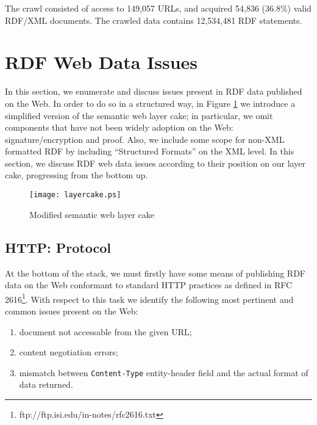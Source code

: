 \documentclass{llncs}
\begin{document}
The crawl consisted of access to 149,057 URLs, and acquired 54,836 (36.8\%) valid RDF/XML documents. The crawled data contains 12,534,481 RDF statements.

\section{RDF Web Data Issues}\label{sec:issues}

In this section, we enumerate and discuss issues present in RDF data published on the Web. 
In order to do so in a structured way, in Figure \ref{fig:layercake} we introduce a simplified version of the semantic web layer cake; in particular, we omit components that have not been widely adoption on the Web: signature/encryption and proof. 
Also, we include some scope for non-XML formatted RDF by including ``Structured Formats'' on the XML level.
In this section, we discuss RDF web data issues according to their position on our layer cake, progressing from the bottom up.

\begin{figure}[!ht]
\begin{center}
\texttt{[image: layercake.ps]}
\end{center}
\caption{\label{fig:layercake} Modified semantic web layer cake}
\end{figure}

\subsection{HTTP: Protocol}
At the bottom of the stack, we must firstly have some means of publishing RDF data on the Web conformant to standard HTTP practices as defined in RFC 2616\footnote{ftp://ftp.isi.edu/in-notes/rfc2616.txt}.
With respect to this task we identify the following most pertinent and common issues present on the Web:

\begin{enumerate}
\item document not accessable from the given URL;
\item content negotiation errors;
\item mismatch between {\tt Content-Type} entity-header field and the actual format of data returned.
\end{enumerate}
\end{document}
